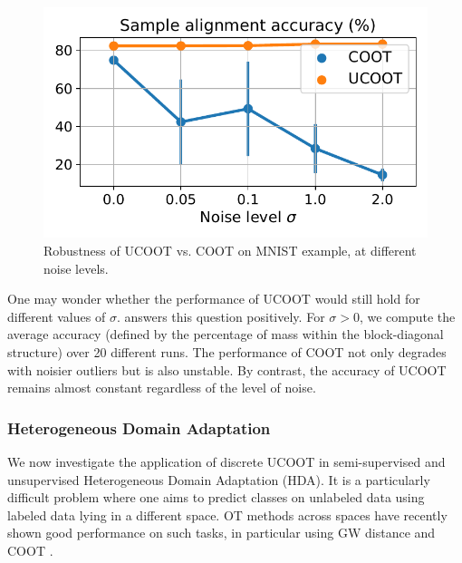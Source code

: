 \setlength{\intextsep}{0pt}
\begin{figure}
    \centering
    \vspace{-12pt}
    \includegraphics[width=\linewidth]{./Chapitre3/fig/mnist-sigma.pdf}
    \vspace*{-9mm}
    \caption{Robustness of UCOOT vs. COOT on MNIST example, at different noise levels.
    \label{f:mnist-sigma}}
\end{figure}
One may wonder whether the performance of UCOOT would still hold for different values of $\sigma$.
 answers this question positively.
For $\sigma > 0$, we compute the average accuracy
(defined by the percentage of mass within the block-diagonal structure) over 20 different runs.
The performance of COOT not only degrades with noisier outliers but is also unstable.
By contrast, the accuracy of UCOOT remains almost constant regardless of the level of noise.

\subsubsection{Heterogeneous Domain Adaptation}

We now investigate the application of discrete UCOOT in semi-supervised and unsupervised
Heterogeneous Domain Adaptation (HDA). It is a particularly difficult problem where
one aims to predict classes on unlabeled data using labeled data lying in a different space.
OT methods across spaces have recently shown good performance on such tasks,
in particular using GW distance \citep{Yan18} and COOT \citep{Redko20}.

